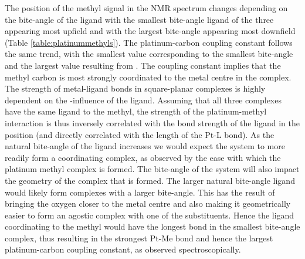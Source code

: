 The position of the methyl signal in the \carbon{} NMR spectrum changes depending on the bite-angle of the ligand with \tBusixantphos{} the smallest bite-angle ligand of the three appearing most upfield and \tBuxantphos{} with the largest bite-angle appearing most downfield (Table \ref{table:platinummethyls}).  The platinum-carbon coupling constant follows the same trend, with the smallest value corresponding to the smallest bite-angle \tBusixantphos{} and the largest value resulting from \tBuxantphos.  The coupling constant implies that the methyl carbon is most strongly coordinated to the metal centre in the \tBusixantphos{} complex.  The strength of metal-ligand bonds in square-planar complexes is highly dependent on the \trans{}-influence of the \trans{} ligand.  Assuming that all three complexes have the same ligand \trans{} to the methyl, the strength of the platinum-methyl interaction is thus inversely correlated with the bond strength of the ligand in the \trans{} position (and directly correlated with the length of the Pt-L bond).  As the natural bite-angle of the ligand increases we would expect the system to more readily form a \trans{} coordinating complex, as observed by the ease with which the platinum methyl complex is formed.  The bite-angle of the system will also impact the geometry of the complex that is formed.  The larger natural bite-angle \tBuxantphos{} ligand would likely form complexes with a larger bite-angle.  This has the result of bringing the oxygen closer to the metal centre and also making it geometrically easier to form an agostic complex with one of the \tBu{} substituents.  Hence the ligand coordinating \trans{} to the methyl would have the longest bond in the smallest bite-angle \tBusixantphos{} complex, thus resulting in the strongest Pt-Me bond and hence the largest platinum-carbon coupling constant, as observed spectroscopically.  

